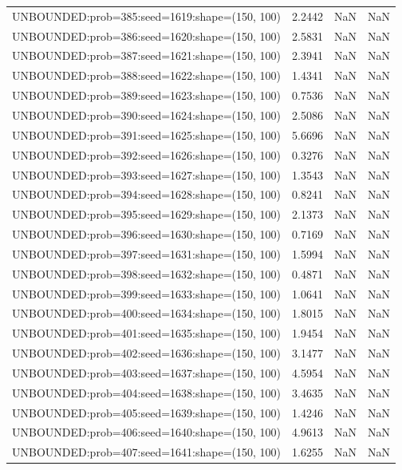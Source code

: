 \begin{longtable}{lccc}
UNBOUNDED:prob=385:seed=1619:shape=(150, 100) &  2.2442 &   NaN &    NaN \\
UNBOUNDED:prob=386:seed=1620:shape=(150, 100) &  2.5831 &   NaN &    NaN \\
UNBOUNDED:prob=387:seed=1621:shape=(150, 100) &  2.3941 &   NaN &    NaN \\
UNBOUNDED:prob=388:seed=1622:shape=(150, 100) &  1.4341 &   NaN &    NaN \\
UNBOUNDED:prob=389:seed=1623:shape=(150, 100) &  0.7536 &   NaN &    NaN \\
UNBOUNDED:prob=390:seed=1624:shape=(150, 100) &  2.5086 &   NaN &    NaN \\
UNBOUNDED:prob=391:seed=1625:shape=(150, 100) &  5.6696 &   NaN &    NaN \\
UNBOUNDED:prob=392:seed=1626:shape=(150, 100) &  0.3276 &   NaN &    NaN \\
UNBOUNDED:prob=393:seed=1627:shape=(150, 100) &  1.3543 &   NaN &    NaN \\
UNBOUNDED:prob=394:seed=1628:shape=(150, 100) &  0.8241 &   NaN &    NaN \\
UNBOUNDED:prob=395:seed=1629:shape=(150, 100) &  2.1373 &   NaN &    NaN \\
UNBOUNDED:prob=396:seed=1630:shape=(150, 100) &  0.7169 &   NaN &    NaN \\
UNBOUNDED:prob=397:seed=1631:shape=(150, 100) &  1.5994 &   NaN &    NaN \\
UNBOUNDED:prob=398:seed=1632:shape=(150, 100) &  0.4871 &   NaN &    NaN \\
UNBOUNDED:prob=399:seed=1633:shape=(150, 100) &  1.0641 &   NaN &    NaN \\
UNBOUNDED:prob=400:seed=1634:shape=(150, 100) &  1.8015 &   NaN &    NaN \\
UNBOUNDED:prob=401:seed=1635:shape=(150, 100) &  1.9454 &   NaN &    NaN \\
UNBOUNDED:prob=402:seed=1636:shape=(150, 100) &  3.1477 &   NaN &    NaN \\
UNBOUNDED:prob=403:seed=1637:shape=(150, 100) &  4.5954 &   NaN &    NaN \\
UNBOUNDED:prob=404:seed=1638:shape=(150, 100) &  3.4635 &   NaN &    NaN \\
UNBOUNDED:prob=405:seed=1639:shape=(150, 100) &  1.4246 &   NaN &    NaN \\
UNBOUNDED:prob=406:seed=1640:shape=(150, 100) &  4.9613 &   NaN &    NaN \\
UNBOUNDED:prob=407:seed=1641:shape=(150, 100) &  1.6255 &   NaN &    NaN \\

\end{longtable}

